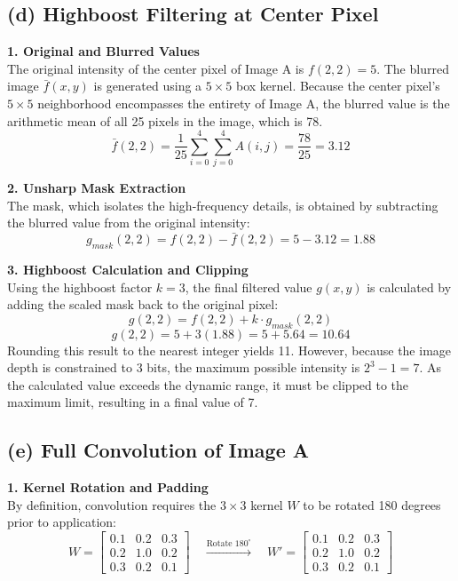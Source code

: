 \documentclass{article}
\begin{document}
\subsection*{(d) Highboost Filtering at Center Pixel}

\textbf{1. Original and Blurred Values}\\
The original intensity of the center pixel of Image A is $f(2,2) = 5$. 
The blurred image $\bar{f}(x,y)$ is generated using a $5\times5$ box kernel. 
Because the center pixel's $5\times5$ neighborhood encompasses the entirety of Image A, 
the blurred value is the arithmetic mean of all 25 pixels in the image, which is 78.
\[
\bar{f}(2,2) = \frac{1}{25} \sum_{i=0}^{4} \sum_{j=0}^{4} A(i,j) = \frac{78}{25} = 3.12
\]

\vspace{1em}
\textbf{2. Unsharp Mask Extraction}\\
The mask, which isolates the high-frequency details, is obtained by subtracting the blurred value 
from the original intensity:
\[
g_{mask}(2,2) = f(2,2) - \bar{f}(2,2) = 5 - 3.12 = 1.88
\]

\vspace{1em}
\textbf{3. Highboost Calculation and Clipping}\\
Using the highboost factor $k=3$, the final filtered value $g(x,y)$ is calculated by adding the 
scaled mask back to the original pixel:
\[
g(2,2) = f(2,2) + k \cdot g_{mask}(2,2)
\]
\[
g(2,2) = 5 + 3(1.88) = 5 + 5.64 = 10.64
\]
Rounding this result to the nearest integer yields 11. However, because the image depth is constrained 
to 3 bits, the maximum possible intensity is $2^3 - 1 = 7$. As the calculated value exceeds the dynamic 
range, it must be clipped to the maximum limit, resulting in a final value of 7.

\subsection*{(e) Full Convolution of Image A}

\textbf{1. Kernel Rotation and Padding}\\
By definition, convolution requires the $3\times3$ kernel $W$ to be rotated 180 degrees prior to application:
\[
W = \begin{bmatrix}
0.1 & 0.2 & 0.3 \\
0.2 & 1.0 & 0.2 \\
0.3 & 0.2 & 0.1 
\end{bmatrix} \quad \xrightarrow{\text{Rotate } 180^{\circ}} \quad W' = \begin{bmatrix}
0.1 & 0.2 & 0.3 \\
0.2 & 1.0 & 0.2 \\
0.3 & 0.2 & 0.1 
\end{bmatrix}
\]
\end{document}
